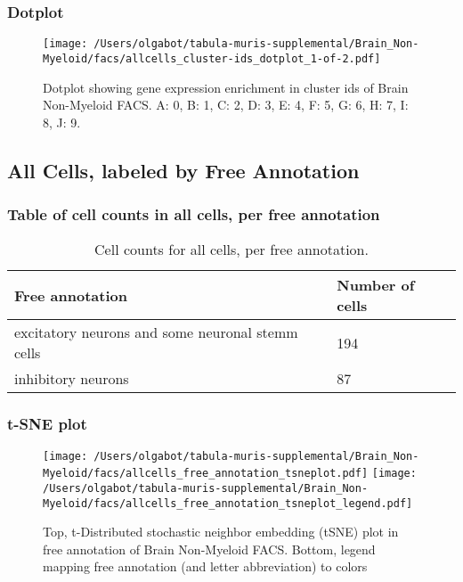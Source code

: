 \newpage
\newpage
\subsubsection{Dotplot}
\begin{figure}[h]
\centering
\texttt{[image: /Users/olgabot/tabula-muris-supplemental/Brain\_Non-Myeloid/facs/allcells\_cluster-ids\_dotplot\_1-of-2.pdf]}

\caption{ Dotplot  showing gene expression enrichment in cluster ids of Brain Non-Myeloid FACS. A: 0, B: 1, C: 2, D: 3, E: 4, F: 5, G: 6, H: 7, I: 8, J: 9.}
\end{figure}


\newpage
\subsection{All Cells, labeled by Free Annotation}
\subsubsection{Table of cell counts in all cells, per free annotation}\begin{table}[h]
\centering
\label{my-label}
\begin{tabular}{@{}ll@{}}
\toprule

Free annotation& Number of cells \\ \midrule
excitatory neurons and some neuronal stemm cells & 194 \\

inhibitory neurons & 87 \\
\bottomrule
\end{tabular}
\caption{Cell counts for all cells, per free annotation.}
\end{table}

\newpage
\subsubsection{t-SNE plot}
\begin{figure}[h]
\centering
\texttt{[image: /Users/olgabot/tabula-muris-supplemental/Brain\_Non-Myeloid/facs/allcells\_free\_annotation\_tsneplot.pdf]}
\texttt{[image: /Users/olgabot/tabula-muris-supplemental/Brain\_Non-Myeloid/facs/allcells\_free\_annotation\_tsneplot\_legend.pdf]}
\caption{Top, t-Distributed stochastic neighbor embedding (tSNE) plot  in free annotation of Brain Non-Myeloid FACS. Bottom, legend mapping free annotation (and letter abbreviation) to colors}
\end{figure}


